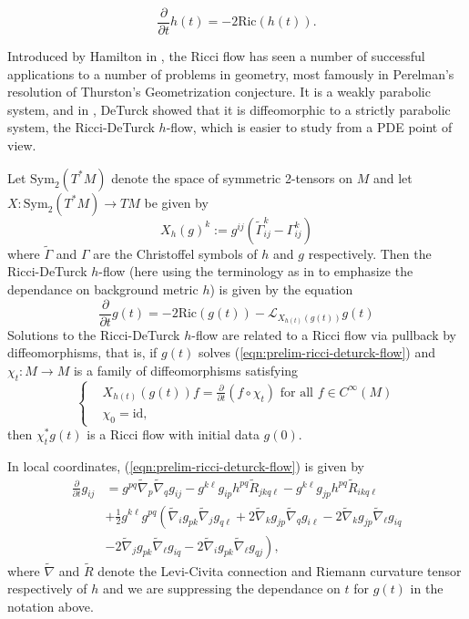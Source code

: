 \documentclass[12pt]{amsart}
\theoremstyle{plain}
\theoremstyle{plain}
\theoremstyle{definition}
\theoremstyle{remark}
\numberwithin{equation}{subsection}
\newcommand{\hdel}{\tilde{\nabla}}
\begin{document}
\begin{equation*}
    \frac{\partial}{\partial t} h(t) = -2\text{Ric}(h(t)).
\end{equation*}

Introduced by Hamilton in \cite{hamilton_three-manifolds_1982}, the Ricci flow has seen a number of successful applications to a number of problems in geometry, most famously in Perelman's resolution of Thurston's Geometrization conjecture. It is a weakly parabolic system, and in \cite{deturck_deforming_1983}, DeTurck showed that it is diffeomorphic to a strictly parabolic system, the Ricci-DeTurck $h$-flow, which is easier to study from a PDE point of view.

Let $\text{Sym}_2(T^\ast M)$ denote the space of symmetric 2-tensors on $M$ and let $X:\text{Sym}_2(T^\ast M) \to TM$ be given by
\begin{equation*}
    X_{h}(g)^k := g^{ij}\left(\tilde{\Gamma}^k_{ij} - \Gamma^k_{ij}\right)
\end{equation*}
where $\tilde{\Gamma}$ and $\Gamma$ are the Christoffel symbols of $h$ and $g$ respectively. Then the Ricci-DeTurck $h$-flow (here using the terminology as in \cite{simon_deformation_2002} to emphasize the dependance on background metric $h$) is given by the equation
\begin{equation}\label{eqn:prelim-ricci-deturck-flow}
    \frac{\partial}{\partial t} g(t) = -2\text{Ric}(g(t)) - \mathcal{L}_{X_{h(t)}(g(t))}g(t)
\end{equation}
Solutions to the Ricci-DeTurck $h$-flow are related to a Ricci flow via pullback by diffeomorphisms, that is, if $g(t)$ solves (\ref{eqn:prelim-ricci-deturck-flow}) and $\chi_t:M\to M$ is a family of diffeomorphisms satisfying
\begin{equation}\label{eqn:prelim-rdf-to-rf-diffeomorphisms}
    \begin{cases}
        &X_{h(t)}(g(t))f = \frac{\partial}{\partial t}\left(f \circ \chi_t\right) \text{ for all } f \in C^\infty(M) \\
        &\chi_0 = \text{id},
    \end{cases}
\end{equation}
then $\chi_t^\ast g(t)$ is a Ricci flow with initial data $g(0)$.

In local coordinates, (\ref{eqn:prelim-ricci-deturck-flow}) is given by
\begin{align}\label{eqn:prelim-rdf-local-coords}
    \frac{\partial}{\partial t} g_{ij} &= g^{pq}\hdel_p\hdel_qg_{ij} - g^{k\ell}g_{ip}h^{pq}\tilde{R}_{jkq\ell} - g^{k\ell}g_{jp}h^{pq}\tilde{R}_{ikq\ell} \nonumber \\
    &+ \frac{1}{2}g^{k\ell}g^{pq}\left(\hdel_i g_{pk}\hdel_j g_{q\ell} + 2\hdel_k g_{jp}\hdel_q g_{i\ell} - 2\hdel_k g_{jp} \hdel_\ell g_{iq} \right. \nonumber \\
    &\left. -2\hdel_j g_{pk} \hdel_\ell g_{iq} - 2\hdel_i g_{pk} \hdel_\ell g_{qj}\right),
\end{align}
where $\hdel$ and $\tilde{R}$ denote the Levi-Civita connection and Riemann curvature tensor respectively of $h$ and we are suppressing the dependance on $t$ for $g(t)$ in the notation above.
\end{document}
